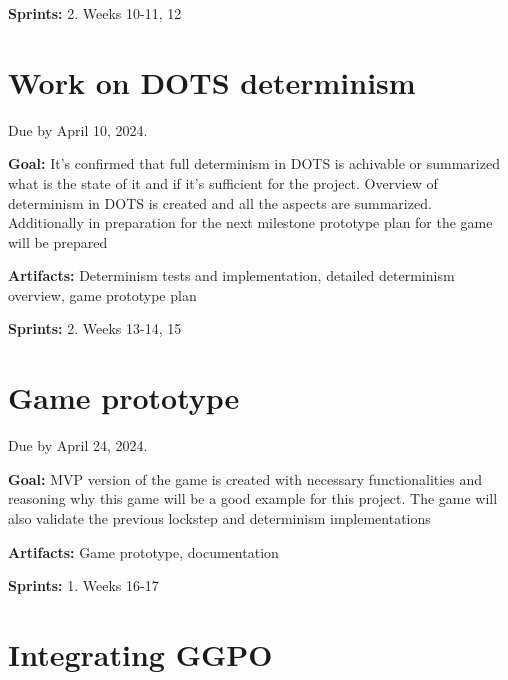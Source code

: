 \noindent\textbf{Sprints:} 2. Weeks 10-11, 12\newline

\section{Work on DOTS determinism}

Due by April 10, 2024.\newline

\noindent\textbf{Goal:} It's confirmed that full determinism in DOTS is achivable or summarized what is the state of it and if it's sufficient for the project. Overview of determinism in DOTS is created and all the aspects are summarized. Additionally in preparation for the next milestone prototype plan for the game will be prepared\newline

\noindent\textbf{Artifacts:} Determinism tests and implementation, detailed determinism overview, game prototype plan \newline

\noindent\textbf{Sprints:} 2. Weeks 13-14, 15\newline

\section{Game prototype}

Due by April 24, 2024.\newline

\noindent\textbf{Goal:} MVP version of the game is created with necessary functionalities and reasoning why this game will be a good example for this project. The game will also validate the previous lockstep and determinism implementations \newline

\noindent\textbf{Artifacts:} Game prototype, documentation\newline

\noindent\textbf{Sprints:} 1. Weeks 16-17\newline

\section{Integrating GGPO}

